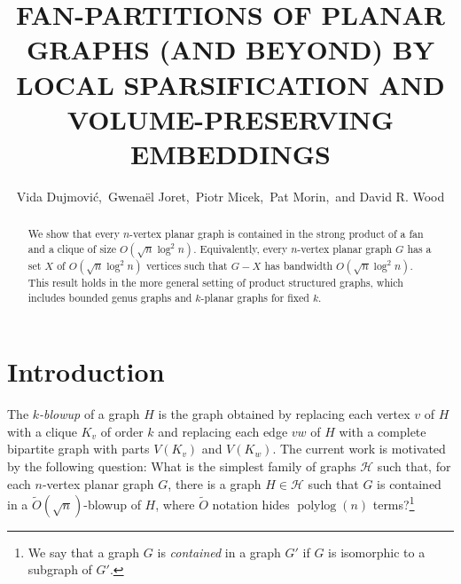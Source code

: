 \documentclass{patmorin}
\title{\MakeUppercase{Fan-Partitions of Planar Graphs (and Beyond)
  \newline by Local Sparsification and Volume-Preserving Embeddings}}
\author{Vida Dujmović,\, 
        Gwenaël Joret,\,
        Piotr Micek,\,
        Pat Morin,\,
        and David R. Wood}
\date{}
\newcommand{\david}[1]{{\color{orange} David: #1}}
\newcommand{\pat}[1]{\textcolor{Blue}{Pat: #1}}
\newcommand{\defin}[1]{\emph{\textcolor{brightmaroon}{#1}}}
\DeclareMathOperator{\polylog}{polylog}
\begin{document}
\maketitle

\begin{abstract}
  We show that every $n$-vertex planar graph is contained in the strong product of a fan and a clique of size $O(\sqrt{n}\log^2 n)$.  Equivalently, every $n$-vertex planar graph $G$ has a set $X$ of $O(\sqrt{n}\log^2 n)$ vertices such that $G-X$ has bandwidth $O(\sqrt{n}\log^2 n)$.  This result holds in the more general setting of product structured graphs, which includes bounded genus graphs and $k$-planar graphs for fixed $k$.
\end{abstract}

\section{Introduction}

%

The \defin{$k$-blowup} of a graph $H$ is the graph obtained by replacing each vertex $v$ of $H$ with a clique $K_v$ of order $k$ and replacing each edge $vw$ of $H$ with a complete bipartite graph with parts $V(K_v)$ and $V(K_w)$.  The current work is motivated by the following question: What is the simplest family of graphs $\mathcal{H}$ such that, for each $n$-vertex planar graph $G$, there is a graph $H\in\mathcal{H}$ such that $G$ is contained in a $\tilde{O}(\sqrt{n})$-blowup of $H$, where $\tilde{O}$ notation hides $\polylog(n)$ terms?\footnote{We say that a graph $G$ is \defin{contained} in a graph $G'$ if $G$ is isomorphic to a subgraph of $G'$.}
\end{document}
